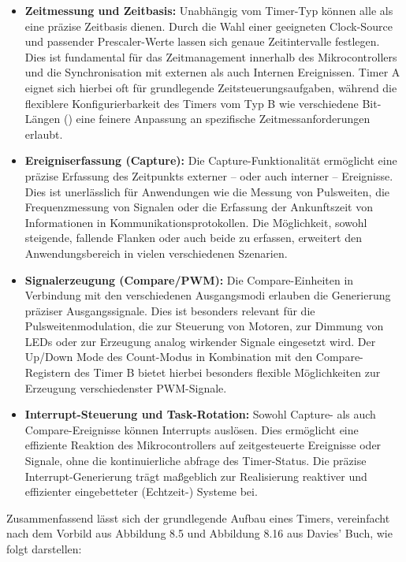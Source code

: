 \begin{itemize}
	\item \textbf{Zeitmessung und Zeitbasis:} Unabh\"angig vom Timer-Typ k\"onnen alle als eine pr\"azise Zeitbasis dienen. Durch die Wahl einer geeigneten Clock-Source und passender Prescaler-Werte lassen sich genaue Zeitintervalle festlegen. Dies ist fundamental f\"ur das Zeitmanagement innerhalb des Mikrocontrollers und die Synchronisation mit externen als auch Internen Ereignissen. Timer A eignet sich hierbei oft f\"ur grundlegende Zeitsteuerungsaufgaben, w\"ahrend die flexiblere Konfigurierbarkeit des Timers vom Typ B wie \zB verschiedene Bit-L\"angen () eine feinere Anpassung an spezifische Zeitmessanforderungen erlaubt.

	\item \textbf{Ereigniserfassung (Capture):} Die Capture-Funktionalit\"at erm\"oglicht eine pr\"azise Erfassung des Zeitpunkts externer -- oder \ggf auch interner -- Ereignisse. Dies ist unerl\"asslich f\"ur Anwendungen wie die Messung von Pulsweiten, die Frequenzmessung von Signalen oder die Erfassung der Ankunftszeit von Informationen in Kommunikationsprotokollen. Die M\"oglichkeit, sowohl steigende, fallende Flanken oder auch beide zu erfassen, erweitert den Anwendungsbereich in vielen verschiedenen Szenarien.

	\item \textbf{Signalerzeugung (Compare/PWM):} Die Compare-Einheiten in Verbindung mit den verschiedenen Ausgangsmodi erlauben die Generierung pr\"aziser Ausgangssignale. Dies ist besonders relevant f\"ur die Pulsweitenmodulation, die zur Steuerung von Motoren, zur Dimmung von LEDs oder zur Erzeugung analog wirkender Signale eingesetzt wird. Der Up/Down Mode des Count-Modus in Kombination mit den Compare-Registern des Timer B bietet hierbei besonders flexible M\"oglichkeiten zur Erzeugung verschiedenster PWM-Signale.

	\item \textbf{Interrupt-Steuerung und Task-Rotation:} Sowohl Capture- als auch Compare-Ereignisse k\"onnen Interrupts ausl\"osen. Dies erm\"oglicht eine effiziente Reaktion des Mikrocontrollers auf zeitgesteuerte Ereignisse oder Signale, ohne die kontinuierliche abfrage des Timer-Status. Die pr\"azise Interrupt-Generierung tr\"agt ma{\ss}geblich zur Realisierung reaktiver und effizienter eingebetteter (Echtzeit-) Systeme bei.
\end{itemize}

Zusammenfassend l\"asst sich der grundlegende Aufbau eines Timers, vereinfacht nach dem Vorbild aus Abbildung 8.5 und Abbildung 8.16 aus Davies' Buch, wie folgt darstellen:

